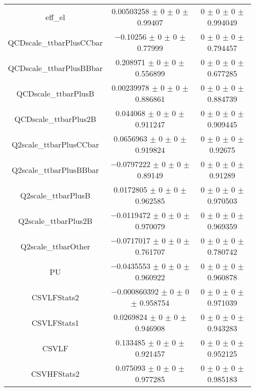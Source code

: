 \begin{table}
\begin{tabular}{ccc}
eff\_el & \num{0.00503258} $\pm$ \num{0} $\pm$ \num{0} $\pm$ \num{0.99407} & \num{0} $\pm$ \num{0} $\pm$ \num{0} $\pm$ \num{0.994049}\\
QCDscale\_ttbarPlusCCbar & \num{-0.10256} $\pm$ \num{0} $\pm$ \num{0} $\pm$ \num{0.77999} & \num{0} $\pm$ \num{0} $\pm$ \num{0} $\pm$ \num{0.794457}\\
QCDscale\_ttbarPlusBBbar & \num{0.208971} $\pm$ \num{0} $\pm$ \num{0} $\pm$ \num{0.556899} & \num{0} $\pm$ \num{0} $\pm$ \num{0} $\pm$ \num{0.677285}\\
QCDscale\_ttbarPlusB & \num{0.00239978} $\pm$ \num{0} $\pm$ \num{0} $\pm$ \num{0.886861} & \num{0} $\pm$ \num{0} $\pm$ \num{0} $\pm$ \num{0.884739}\\
QCDscale\_ttbarPlus2B & \num{0.044068} $\pm$ \num{0} $\pm$ \num{0} $\pm$ \num{0.911247} & \num{0} $\pm$ \num{0} $\pm$ \num{0} $\pm$ \num{0.909445}\\
Q2scale\_ttbarPlusCCbar & \num{0.0656963} $\pm$ \num{0} $\pm$ \num{0} $\pm$ \num{0.919824} & \num{0} $\pm$ \num{0} $\pm$ \num{0} $\pm$ \num{0.92675}\\
Q2scale\_ttbarPlusBBbar & \num{-0.0797222} $\pm$ \num{0} $\pm$ \num{0} $\pm$ \num{0.89149} & \num{0} $\pm$ \num{0} $\pm$ \num{0} $\pm$ \num{0.91289}\\
Q2scale\_ttbarPlusB & \num{0.0172805} $\pm$ \num{0} $\pm$ \num{0} $\pm$ \num{0.962585} & \num{0} $\pm$ \num{0} $\pm$ \num{0} $\pm$ \num{0.970503}\\
Q2scale\_ttbarPlus2B & \num{-0.0119472} $\pm$ \num{0} $\pm$ \num{0} $\pm$ \num{0.970079} & \num{0} $\pm$ \num{0} $\pm$ \num{0} $\pm$ \num{0.969359}\\
Q2scale\_ttbarOther & \num{-0.0717017} $\pm$ \num{0} $\pm$ \num{0} $\pm$ \num{0.761707} & \num{0} $\pm$ \num{0} $\pm$ \num{0} $\pm$ \num{0.780742}\\
PU & \num{-0.0435553} $\pm$ \num{0} $\pm$ \num{0} $\pm$ \num{0.960922} & \num{0} $\pm$ \num{0} $\pm$ \num{0} $\pm$ \num{0.960878}\\
CSVLFStats2 & \num{-0.000860392} $\pm$ \num{0} $\pm$ \num{0} $\pm$ \num{0.958754} & \num{0} $\pm$ \num{0} $\pm$ \num{0} $\pm$ \num{0.971039}\\
CSVLFStats1 & \num{0.0269824} $\pm$ \num{0} $\pm$ \num{0} $\pm$ \num{0.946908} & \num{0} $\pm$ \num{0} $\pm$ \num{0} $\pm$ \num{0.943283}\\
CSVLF & \num{0.133485} $\pm$ \num{0} $\pm$ \num{0} $\pm$ \num{0.921457} & \num{0} $\pm$ \num{0} $\pm$ \num{0} $\pm$ \num{0.952125}\\
CSVHFStats2 & \num{0.075093} $\pm$ \num{0} $\pm$ \num{0} $\pm$ \num{0.977285} & \num{0} $\pm$ \num{0} $\pm$ \num{0} $\pm$ \num{0.985183}\\

\end{tabular}
\end{table}
